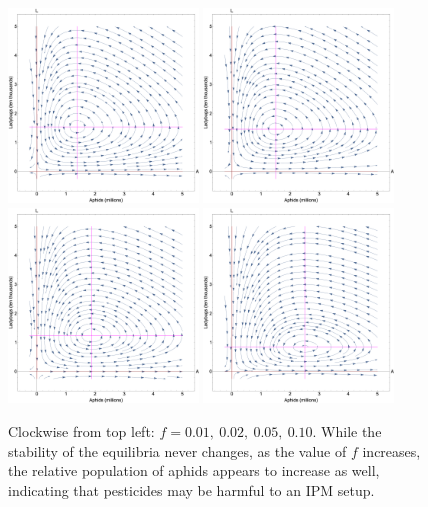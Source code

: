 \documentclass[10pt]{article}
\newcommand{\np}{\vfill\newpage}
\begin{document}
\np

\begin{figure}[h]
	\centering
	\includegraphics[width=0.45\textwidth]{pesticide_model_f1.png}
	\includegraphics[width=0.45\textwidth]{pesticide_model_f2.png} \\ [1ex]
	\includegraphics[width=0.45\textwidth]{pesticide_model_f3.png}
	\includegraphics[width=0.45\textwidth]{pesticide_model_f4.png}
	\caption{Clockwise from top left: \( f = 0.01, \ 0.02, \ 0.05, \ 0.10 \). While the stability of the equilibria never changes, as the value of \(f\) increases, the relative population of aphids appears to increase as well, indicating that pesticides may be harmful to an IPM setup.}
	\label{fig:pesticidemodelnullcline}
\end{figure}
\end{document}
